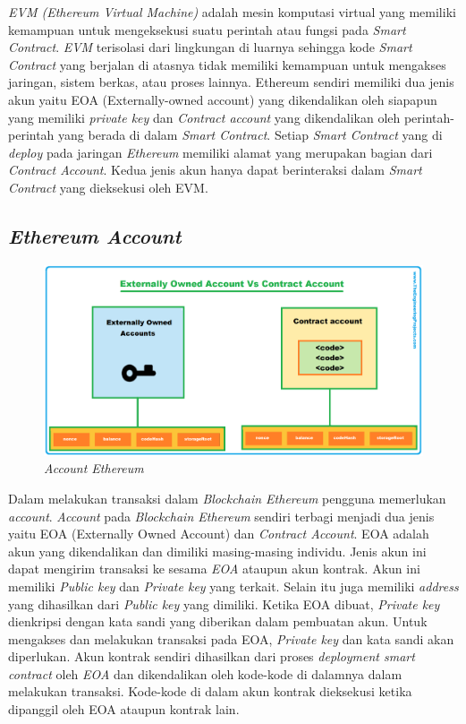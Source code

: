 \emph{EVM (Ethereum Virtual Machine)} adalah mesin komputasi virtual yang memiliki kemampuan untuk mengeksekusi suatu perintah atau fungsi pada \emph{Smart Contract}. \emph{EVM} terisolasi dari lingkungan di luarnya sehingga kode \emph{Smart Contract} yang berjalan di atasnya tidak memiliki kemampuan untuk mengakses jaringan, sistem berkas, atau proses lainnya. Ethereum sendiri memiliki dua jenis akun yaitu EOA (Externally-owned account) yang dikendalikan oleh siapapun yang memiliki \emph{private key} dan \emph{Contract account} yang dikendalikan oleh perintah-perintah yang berada di dalam \emph{Smart Contract}. Setiap \emph{Smart Contract} yang di \emph{deploy} pada jaringan \emph{Ethereum} memiliki alamat yang merupakan bagian dari \emph{Contract Account}. Kedua jenis akun hanya dapat berinteraksi dalam \emph{Smart Contract} yang dieksekusi oleh EVM.

\subsection{\emph{Ethereum Account}}

\begin{figure} [ht] \centering
  \includegraphics[scale=0.2]{gambar/img-ethereum-account.png}
  \caption{\emph{Account Ethereum}}
  \label{fig:Metaverse}
\end{figure}

Dalam melakukan transaksi dalam \emph{Blockchain Ethereum} pengguna memerlukan \emph{account}. \emph{Account} pada \emph{Blockchain Ethereum} sendiri terbagi menjadi dua jenis yaitu EOA (Externally Owned Account) dan \emph{Contract Account}. EOA adalah akun yang dikendalikan dan dimiliki masing-masing individu. Jenis akun ini dapat mengirim transaksi ke sesama \emph{EOA} ataupun akun kontrak. Akun ini memiliki \emph{Public key} dan \emph{Private key} yang terkait. Selain itu juga memiliki \emph{address} yang dihasilkan dari \emph{Public key} yang dimiliki. Ketika EOA dibuat, \emph{Private key} dienkripsi dengan kata sandi yang diberikan dalam pembuatan akun. Untuk mengakses dan melakukan transaksi pada EOA, \emph{Private key} dan kata sandi akan diperlukan. Akun kontrak sendiri dihasilkan dari proses \emph{deployment smart contract} oleh \emph{EOA} dan dikendalikan oleh kode-kode di dalamnya dalam melakukan transaksi. Kode-kode di dalam akun kontrak dieksekusi ketika dipanggil oleh EOA ataupun kontrak lain.  
\parencite{BahgaArshdeep}

